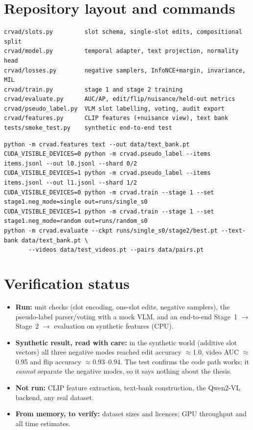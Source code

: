 \documentclass[11pt,a4paper]{article}
\begin{document}
\appendix
\section{Repository layout and commands}
\begin{lstlisting}
crvad/slots.py         slot schema, single-slot edits, compositional split
crvad/model.py         temporal adapter, text projection, normality head
crvad/losses.py        negative samplers, InfoNCE+margin, invariance, MIL
crvad/train.py         stage 1 and stage 2 training
crvad/evaluate.py      AUC/AP, edit/flip/nuisance/held-out metrics
crvad/pseudo_label.py  VLM slot labelling, voting, audit export
crvad/features.py      CLIP features (+nuisance view), text bank
tests/smoke_test.py    synthetic end-to-end test
\end{lstlisting}
\begin{lstlisting}
python -m crvad.features text --out data/text_bank.pt
CUDA_VISIBLE_DEVICES=0 python -m crvad.pseudo_label --items items.jsonl --out l0.jsonl --shard 0/2
CUDA_VISIBLE_DEVICES=1 python -m crvad.pseudo_label --items items.jsonl --out l1.jsonl --shard 1/2
CUDA_VISIBLE_DEVICES=0 python -m crvad.train --stage 1 --set stage1.neg_mode=single out=runs/single_s0
CUDA_VISIBLE_DEVICES=1 python -m crvad.train --stage 1 --set stage1.neg_mode=random out=runs/random_s0
python -m crvad.evaluate --ckpt runs/single_s0/stage2/best.pt --text-bank data/text_bank.pt \
       --videos data/test_videos.pt --pairs data/pairs.pt
\end{lstlisting}

\section{Verification status}
\label{sec:status}
\begin{itemize}
\item \textbf{Run:} unit checks (slot encoding, one-slot edits, negative samplers), the pseudo-label parser/voting with a mock VLM, and an end-to-end Stage~1 $\rightarrow$ Stage~2 $\rightarrow$ evaluation on synthetic features (CPU).
\item \textbf{Synthetic result, read with care:} in the synthetic world (additive slot vectors) all three negative modes reached edit accuracy $\approx$1.0, video AUC $\approx$0.95 and flip accuracy $\approx$0.93--0.94. The test confirms the code path works; it \emph{cannot} separate the negative modes, so it says nothing about the thesis.
\item \textbf{Not run:} CLIP feature extraction, text-bank construction, the Qwen2-VL backend, any real dataset.
\item \textbf{From memory, to verify:} dataset sizes and licences; GPU throughput and all time estimates.
\end{itemize}
\end{document}
